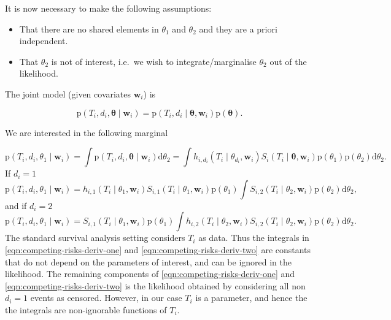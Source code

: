 \documentclass[
  10pt,
  a4paper,
]{article}
\providecommand{\tightlist}{%
  \setlength{\itemsep}{0pt}\setlength{\parskip}{0pt}}
\newcommand{\pd}{\text{p}}
\begin{document}
It is now necessary to make the following assumptions:

\begin{itemize}
\tightlist
\item
  That there are no shared elements in \(\theta_{1}\) and \(\theta_{2}\)
  and they are a priori independent.
\item
  That \(\theta_{2}\) is not of interest, i.e.~we wish to
  integrate/marginalise \(\theta_{2}\) out of the likelihood.
\end{itemize}

The joint model (given covariates \(\boldsymbol{w}_{i}\)) is

\begin{equation}
  \pd(T_{i}, d_{i}, \boldsymbol{\theta} \mid \boldsymbol{w}_{i}) =
    \pd(T_{i}, d_{i} \mid \boldsymbol{\theta}, \boldsymbol{w}_{i})\pd(\boldsymbol{\theta}).
\end{equation}

We are interested in the following marginal

\begin{equation}
  \pd(T_{i}, d_{i}, \theta_{1} \mid \boldsymbol{w}_{i})
  = \int \pd(T_{i}, d_{i}, \boldsymbol{\theta} \mid \boldsymbol{w}_{i}) \text{d}\theta_{2}
  = \int h_{i, d_{i}}(T_{i} \mid \theta_{d_{i}}, \boldsymbol{w}_{i}) S_{i}(T_{i} \mid \boldsymbol{\theta}, \boldsymbol{w}_{i}) \pd(\theta_{1}) \pd(\theta_{2}) \text{d}\theta_{2}.
\end{equation} If \(d_{i} = 1\) \begin{equation}
  \pd(T_{i}, d_{i}, \theta_{1} \mid \boldsymbol{w}_{i})
  = h_{i, 1}(T_{i} \mid \theta_{1}, \boldsymbol{w}_{i}) S_{i, 1}(T_{i} \mid \theta_{1}, \boldsymbol{w}_{i}) \pd(\theta_{1}) \int S_{i, 2}(T_{i} \mid \theta_{2}, \boldsymbol{w}_{i}) \pd(\theta_{2}) \text{d} \theta_{2},
  \label{eqn:competing-risks-deriv-one}
\end{equation} and if \(d_{i} = 2\) \begin{equation}
  \pd(T_{i}, d_{i}, \theta_{1} \mid \boldsymbol{w}_{i})
  = S_{i, 1}(T_{i} \mid \theta_{1}, \boldsymbol{w}_{i}) \pd(\theta_{1}) \int h_{i, 2}(T_{i} \mid \theta_{2}, \boldsymbol{w}_{i}) S_{i, 2}(T_{i} \mid \theta_{2}, \boldsymbol{w}_{i}) \pd(\theta_{2}) \text{d} \theta_{2}.
  \label{eqn:competing-risks-deriv-two}
\end{equation} The standard survival analysis setting considers
\(T_{i}\) as data. Thus the integrals in
\eqref{eqn:competing-risks-deriv-one} and
\eqref{eqn:competing-risks-deriv-two} are constants that do not depend
on the parameters of interest, and can be ignored in the likelihood. The
remaining components of \eqref{eqn:competing-risks-deriv-one} and
\eqref{eqn:competing-risks-deriv-two} is the likelihood obtained by
considering all non \(d_{i} = 1\) events as censored. However, in our
case \(T_{i}\) is a parameter, and hence the the integrals are
non-ignorable functions of \(T_{i}\).
\end{document}
